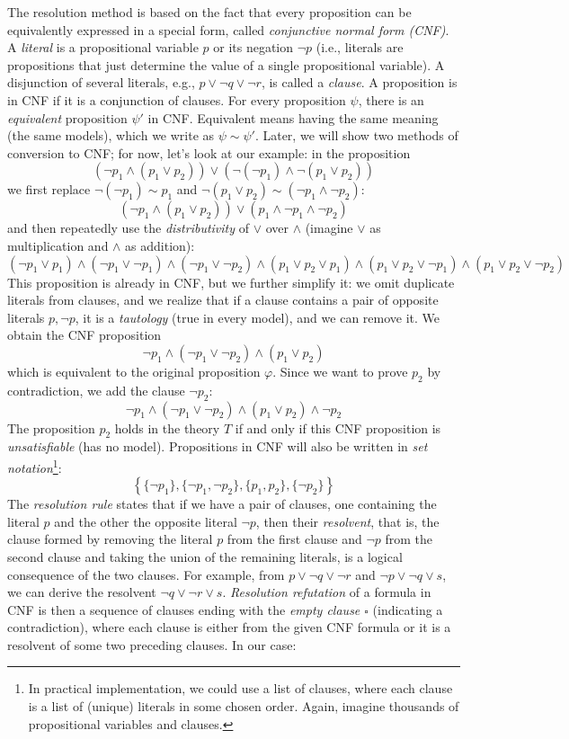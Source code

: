 The resolution method is based on the fact that every proposition can be equivalently expressed in a special form, called \emph{conjunctive normal form (CNF)}. A \emph{literal} is a propositional variable \( p \) or its negation \( \neg p \) (i.e., literals are propositions that just determine the value of a single propositional variable). A disjunction of several literals, e.g., \( p \lor \neg q \lor \neg r \), is called a \emph{clause}. A proposition is in CNF if it is a conjunction of clauses. For every proposition \( \psi \), there is an \emph{equivalent} proposition \( \psi' \) in CNF. Equivalent means having the same meaning (the same models), which we write as \( \psi \sim \psi' \). Later, we will show two methods of conversion to CNF; for now, let’s look at our example: in the proposition
\[
    (\neg p_1 \land (p_1 \lor p_2)) \lor (\neg (\neg p_1) \land \neg (p_1 \lor p_2))
\]
we first replace \( \neg (\neg p_1) \sim p_1 \) and \( \neg (p_1 \lor p_2) \sim (\neg p_1 \land \neg p_2) \):
\[
    (\neg p_1 \land (p_1 \lor p_2)) \lor (p_1 \land \neg p_1 \land \neg p_2)
\]
and then repeatedly use the \emph{distributivity} of \( \lor \) over \( \land \) (imagine \( \lor \) as multiplication and \( \land \) as addition):
\[
    (\neg p_1 \lor p_1) \land (\neg p_1 \lor \neg p_1) \land (\neg p_1 \lor \neg p_2) \land (p_1 \lor p_2 \lor p_1) \land (p_1 \lor p_2 \lor \neg p_1) \land (p_1 \lor p_2 \lor \neg p_2)
\]
This proposition is already in CNF, but we further simplify it: we omit duplicate literals from clauses, and we realize that if a clause contains a pair of opposite literals \( p, \neg p \), it is a \emph{tautology} (true in every model), and we can remove it. We obtain the CNF proposition
\[
    \neg p_1 \land (\neg p_1 \lor \neg p_2) \land (p_1 \lor p_2)
\]
which is equivalent to the original proposition \( \varphi \).
Since we want to prove \( p_2 \) by contradiction, we add the clause \( \neg p_2 \):
\[
    \neg p_1 \land (\neg p_1 \lor \neg p_2) \land (p_1 \lor p_2) \land \neg p_2
\]
The proposition \( p_2 \) holds in the theory \( T \) if and only if this CNF proposition is \emph{unsatisfiable} (has no model). Propositions in CNF will also be written in \emph{set notation}\footnote{In practical implementation, we could use a list of clauses, where each clause is a list of (unique) literals in some chosen order. Again, imagine thousands of propositional variables and clauses.}:
\[
    \left \{ \{\neg p_1\}, \{\neg p_1, \neg p_2\}, \{p_1, p_2\}, \{\neg p_2\} \right \}
\]
The \emph{resolution rule} states that if we have a pair of clauses, one containing the literal \( p \) and the other the opposite literal \( \neg p \), then their \emph{resolvent}, that is, the clause formed by removing the literal \( p \) from the first clause and \( \neg p \) from the second clause and taking the union of the remaining literals, is a logical consequence of the two clauses. For example, from \( p \lor \neg q \lor \neg r \) and \( \neg p \lor \neg q \lor s \), we can derive the resolvent \( \neg q \lor \neg r \lor s \). \emph{Resolution refutation} of a formula in CNF is then a sequence of clauses ending with the \emph{empty clause \( \square \)} (indicating a contradiction), where each clause is either from the given CNF formula or it is a resolvent of some two preceding clauses. In our case:
